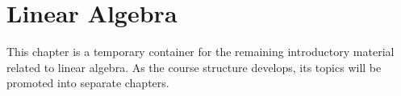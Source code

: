 \chapter{Linear Algebra}

This chapter is a temporary container for the remaining introductory material related to linear algebra. As the course structure develops, its topics will be promoted into separate chapters.



